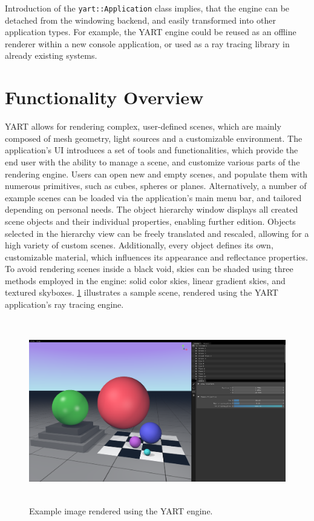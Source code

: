 Introduction of the \verb|yart::Application| class implies, that the engine can be detached from the windowing backend, and easily transformed into other application types.
For example, the YART engine could be reused as an offline renderer within a new console application, or used as a ray tracing library in already existing systems.

\section{Functionality Overview}

YART allows for rendering complex, user-defined scenes, which are mainly composed of mesh geometry, light sources and a customizable environment.
The application's UI introduces a set of tools and functionalities, which provide the end user with the ability to manage a scene, and customize various parts of the rendering engine.
Users can open new and empty scenes, and populate them with numerous primitives, such as cubes, spheres or planes.
Alternatively, a number of example scenes can be loaded via the application's main menu bar, and tailored depending on personal needs. 
The object hierarchy window displays all created scene objects and their individual properties, enabling further edition.
Objects selected in the hierarchy view can be freely translated and rescaled, allowing for a high variety of custom scenes.
Additionally, every object defines its own, customizable material, which influences its appearance and reflectance properties.
To avoid rendering scenes inside a black void, skies can be shaded using three methods employed in the engine: solid color skies, linear gradient skies, and textured skyboxes.
\cref{fig:Application/FunctionalityOverview/render_sample} illustrates a sample scene, rendered using the YART application's ray tracing engine.

\begin{figure}[!ht]
    \centering
    \includegraphics[height=8cm]{res/SampleRender.png}
    \caption[Example image rendered using the YART engine]{Example image rendered using the YART engine.}
    \label{fig:Application/FunctionalityOverview/render_sample}
\end{figure}

